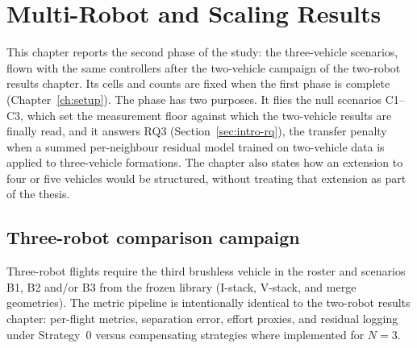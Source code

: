 %
%
%

\chapter{Multi-Robot and Scaling Results}
\label{ch:results3}

This chapter reports the second phase of the study: the three-vehicle scenarios, flown with the
same controllers after the two-vehicle campaign of the two-robot results chapter. Its cells and
counts are fixed when the first phase is complete (Chapter~\ref{ch:setup}). The phase has two
purposes. It flies the null scenarios C1--C3, which set the measurement floor against which the
two-vehicle results are finally read, and it answers RQ3 (Section~\ref{sec:intro-rq}), the transfer
penalty when a summed per-neighbour residual model trained on two-vehicle data is applied to
three-vehicle formations. The chapter also states how an extension to four or five vehicles would be
structured, without treating that extension as part of the thesis.

\section{Three-robot comparison campaign}
\label{sec:res3-campaign}

Three-robot flights require the third brushless vehicle in the roster and scenarios B1, B2 and/or
B3 from the frozen library (I-stack, V-stack, and merge geometries). The metric pipeline is
intentionally identical to the two-robot results chapter: per-flight metrics, separation error, effort
proxies, and residual logging under Strategy~0 versus compensating strategies where implemented
for $N=3$.

